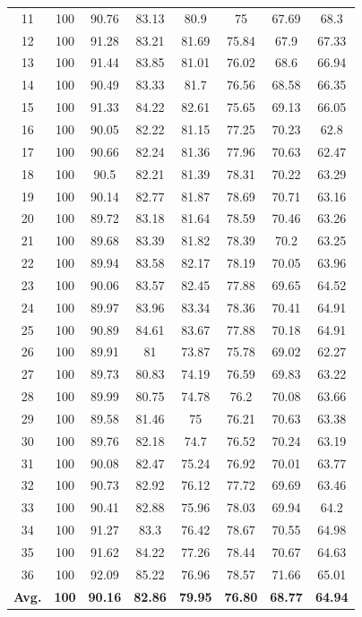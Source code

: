 \documentclass[review]{elsarticle}
\begin{document}
\begin{table}[ht!]
\begin{minipage}{0.48\linewidth}
{\begin{tabular}{c|ccccccc}
				11&100&90.76&83.13&80.9&75&67.69&68.3\\
				12&100&91.28&83.21&81.69&75.84&67.9&67.33\\
				13&100&91.44&83.85&81.01&76.02&68.6&66.94\\
				14&100&90.49&83.33&81.7&76.56&68.58&66.35\\
				15&100&91.33&84.22&82.61&75.65&69.13&66.05\\
				16&100&90.05&82.22&81.15&77.25&70.23&62.8\\
				17&100&90.66&82.24&81.36&77.96&70.63&62.47\\
				18&100&90.5&82.21&81.39&78.31&70.22&63.29\\
				19&100&90.14&82.77&81.87&78.69&70.71&63.16\\
				20&100&89.72&83.18&81.64&78.59&70.46&63.26\\
				21&100&89.68&83.39&81.82&78.39&70.2&63.25\\
				22&100&89.94&83.58&82.17&78.19&70.05&63.96\\
				23&100&90.06&83.57&82.45&77.88&69.65&64.52\\
				24&100&89.97&83.96&83.34&78.36&70.41&64.91\\
				25&100&90.89&84.61&83.67&77.88&70.18&64.91\\
				26&100&89.91&81&73.87&75.78&69.02&62.27\\
				27&100&89.73&80.83&74.19&76.59&69.83&63.22\\
				28&100&89.99&80.75&74.78&76.2&70.08&63.66\\
				29&100&89.58&81.46&75&76.21&70.63&63.38\\
				30&100&89.76&82.18&74.7&76.52&70.24&63.19\\
				31&100&90.08&82.47&75.24&76.92&70.01&63.77\\
				32&100&90.73&82.92&76.12&77.72&69.69&63.46\\
				33&100&90.41&82.88&75.96&78.03&69.94&64.2\\
				34&100&91.27&83.3&76.42&78.67&70.55&64.98\\
				35&100&91.62&84.22&77.26&78.44&70.67&64.63\\
				36&100&92.09&85.22&76.96&78.57&71.66&65.01\\
				\hline
				\textbf{Avg.}&\textbf{100}&\textbf{90.16}&\textbf{82.86}&\textbf{79.95}&\textbf{76.80}&\textbf{68.77}&\textbf{64.94}\\
				\hline\hline	
		\end{tabular}}
	\end{minipage}
\end{table}
\end{document}
